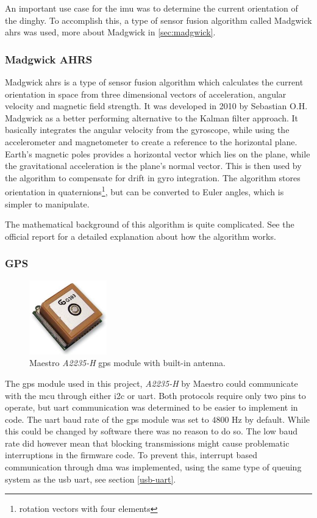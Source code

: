 An important use case for the \gls{imu} was to determine the current orientation of the dinghy. To accomplish this, a type of sensor fusion algorithm called Madgwick \gls{ahrs} was used, more about Madgwick in \autoref{sec:madgwick}.

\subsubsection{Madgwick AHRS}
\label{sec:madgwick}
Madgwick \gls{ahrs} is a type of sensor fusion algorithm which calculates the current orientation in space from three dimensional vectors of acceleration, angular velocity and magnetic field strength. It was developed in 2010 by Sebastian O.H. Madgwick as a better performing alternative to the Kalman filter approach\cite{madgwick}. It basically integrates the angular velocity from the gyroscope, while using the accelerometer and magnetometer to create a reference to the horizontal plane. Earth’s magnetic poles provides a horizontal vector which lies on the plane, while the gravitational acceleration is the plane’s normal vector. This is then used by the algorithm to compensate for drift in gyro integration. The algorithm stores orientation in quaternions\footnote{rotation vectors with four elements}, but can be converted to Euler angles, which is simpler to manipulate.

The mathematical background of this algorithm is quite complicated. See the official report\cite{madgwick-report} for a detailed explanation about how the algorithm works.

\subsubsection{GPS}
\begin{figure}[H]
\centering
\includegraphics[width=0.3\textwidth]{Figures/A2235-H.jpg}
\caption{Maestro \emph{A2235-H} \gls{gps} module with built-in antenna.}
\label{gps-figure}
\end{figure}
The \gls{gps} module used in this project, \emph{A2235-H} by Maestro \cite{gps} could communicate with the \gls{mcu} through either \gls{i2c} or \gls{uart}. Both protocols require only two pins to operate, but \gls{uart} communication was determined to be easier to implement in code. The \gls{uart} baud rate of the \gls{gps} module was set to $4800$ Hz by default. While this could be changed by software there was no reason to do so. The low baud rate did however mean that blocking transmissions might cause problematic interruptions in the firmware code. To prevent this, interrupt based communication through \gls{dma} was implemented, using the same type of queuing system as the \gls{usb} \gls{uart}, see section \ref{usb-uart}.

